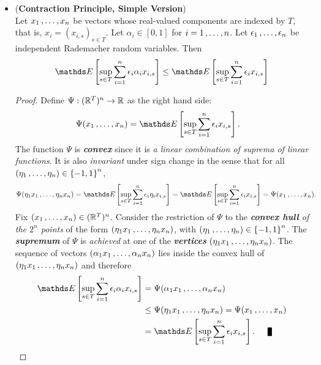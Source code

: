 \documentclass[11pt]{article}
\begin{document}
\begin{itemize}
\item \begin{proposition}(\textbf{Contraction Principle, Simple Version}) \citep{boucheron2013concentration, vershynin2018high}\\
Let $x_1 \,{,}\ldots{,}\, x_n$ be vectors whose real-valued components are indexed by $T$, that is, $x_i = (x_{i,s})_{s \in T}$. Let $\alpha_i \in [0, 1]$ for $i = 1 \,{,}\ldots{,}\, n$. Let $\epsilon_1 \,{,}\ldots{,}\, \epsilon_n$ be independent Rademacher random variables. Then
\begin{align}
\E{}{\sup_{s\in T}\sum_{i=1}^n \epsilon_i \alpha_i x_{i,s}} \le \E{}{\sup_{s\in T}\sum_{i=1}^n \epsilon_i  x_{i,s}}\label{ineqn: contraction_rademacher}
\end{align}
\end{proposition}
\begin{proof}
Define $\Psi: ({\mathbb R}^{T})^n \to {\mathbb R}$ as the right hand side:
\begin{align*}
\Psi(x_1 \xdotx{,} x_n) &= \E{}{\sup_{s \in T}\sum_{i=1}^n \epsilon_i  x_{i,s}}.
\end{align*} The function $\Psi$ is \emph{\textbf{convex}} since it is \emph{a linear combination of suprema of linear functions}. It is also \emph{invariant} under sign change in the sense that for all $(\eta_1 \,{,}\ldots{,}\, \eta_n) \in \left\{-1, 1\right\}^n$,
\begin{align*}
\Psi(\eta_1 x_1 \xdotx{,} \eta_n x_n) &= \E{}{\sup_{s \in T}\sum_{i=1}^n \epsilon_i  \eta_i x_{i,s}} = \E{}{\sup_{s \in T}\sum_{i=1}^n \epsilon_i  x_{i,s}} = \Psi(x_1 \xdotx{,} x_n).
\end{align*} Fix $(x_1 \,{,}\ldots{,}\, x_n) \in ({\mathbb R}^{T})^n$. Consider the restriction of $\Psi$ to the \emph{\textbf{convex hull} of the $2^n$ points} of the form $(\eta_1 x_1 \,{,}\ldots{,}\, \eta_n x_n)$, with $(\eta_1 \,{,}\ldots{,}\, \eta_n) \in \left\{-1, 1\right\}^n$. The \emph{\textbf{supremum}} of $\Psi$ is \emph{achieved} at one of the \emph{\textbf{vertices}} $(\eta_1 x_1 \,{,}\ldots{,}\, \eta_n x_n)$. The sequence of vectors $(\alpha_1 x_1 \,{,}\ldots{,}\, \alpha_n x_n)$ lies inside the convex hull of $(\eta_1 x_1 \,{,}\ldots{,}\, \eta_n x_n)$ and therefore
\begin{align*}
\E{}{\sup_{s\in T}\sum_{i=1}^n \epsilon_i \alpha_i x_{i,s}}   &= \Psi(\alpha_1 x_1 \xdotx{,} \alpha_n x_n) \\
 & \le \Psi(\eta_1 x_1 \xdotx{,} \eta_n x_n) =  \Psi(x_1 \xdotx{,} x_n)\\
 &= \E{}{\sup_{s \in T}\sum_{i=1}^n \epsilon_i  x_{i,s}}. \qed
\end{align*}
\end{proof}


\end{itemize}
\end{document}
